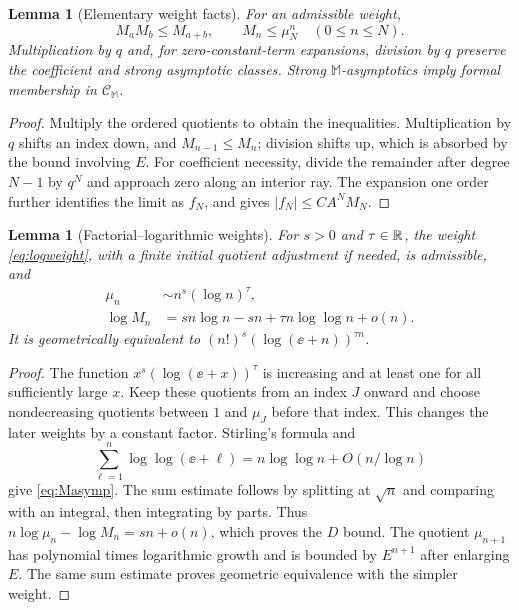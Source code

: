 \documentclass[11pt,a4paper]{article}
\numberwithin{equation}{section}
\newtheorem{lemma}[theorem]{Lemma}
\theoremstyle{definition}\newtheorem{definition}[theorem]{Definition}
\theoremstyle{remark}\newtheorem{remark}[theorem]{Remark}
\newcommand{\M}{\mathbb M}\newcommand{\CM}{\mathcal C_{\M}}
\begin{document}
\begin{lemma}[Elementary weight facts]
\label{lem:weightfacts}
For an admissible weight,
\begin{equation}
 M_aM_b\le M_{a+b},\qquad M_n\le\mu_N^n\quad(0\le n\le N).
 \label{eq:weightfacts}
\end{equation}
Multiplication by $q$ and, for zero-constant-term expansions, division by
$q$ preserve the coefficient and strong asymptotic classes. Strong
$\M$-asymptotics imply formal membership in $\CM$.
\end{lemma}
\begin{proof}
Multiply the ordered quotients to obtain the inequalities. Multiplication
by $q$ shifts an index down, and $M_{n-1}\le M_n$; division shifts up,
which is absorbed by the bound involving $E$. For coefficient necessity,
divide the remainder after degree $N-1$ by $q^N$ and approach zero along
an interior ray. The expansion one order further identifies the limit
as $f_N$, and gives $|f_N|\le CA^NM_N$.
\end{proof}

\begin{lemma}[Factorial--logarithmic weights]
\label{lem:logweights}
For $s>0$ and $\tau\in\mathbb R$, the weight \eqref{eq:logweight}, with a finite
initial quotient adjustment if needed, is admissible, and
\begin{align}
 \mu_n&\sim n^s(\log n)^\tau,\label{eq:muasymp}\\
 \log M_n&=sn\log n-sn+\tau n\log\log n+o(n).
 \label{eq:Masymp}
\end{align}
It is geometrically equivalent to
$(n!)^s(\log(\ee+n))^{\tau n}$.
\end{lemma}
\begin{proof}
The function $x^s(\log(\ee+x))^\tau$ is increasing and at least one
for all sufficiently large $x$. Keep these quotients from an index $J$
onward and choose nondecreasing quotients between $1$ and $\mu_J$
before that index. This changes the later weights by a constant factor.
Stirling's formula and
\[
 \sum_{\ell=1}^n\log\log(\ee+\ell)
 =n\log\log n+O(n/\log n)
\]
give \eqref{eq:Masymp}. The sum estimate follows by splitting at $\sqrt n$
and comparing with an integral, then integrating by parts.
Thus $n\log\mu_n-\log M_n=sn+o(n)$, which proves the $D$ bound.
The quotient $\mu_{n+1}$ has polynomial times logarithmic growth and is
bounded by $E^{n+1}$ after enlarging $E$. The same sum estimate proves
geometric equivalence with the simpler weight.
\end{proof}
\end{document}
